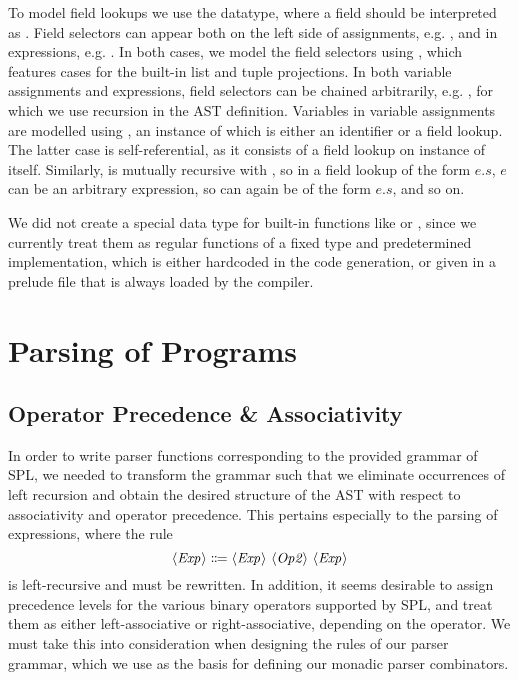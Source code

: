 To model field lookups we use the  datatype, where a field
 should be interpreted as .
Field selectors can appear both on the left side of assignments, e.g.
, and in expressions, e.g. . In both cases, we
model the field selectors using , which features cases for the
built-in list and tuple projections.
In both variable assignments and expressions, field selectors can be chained
arbitrarily, e.g. , for which we use recursion in the AST
definition.
Variables in variable assignments are modelled using , an
instance of which is either an identifier or a field lookup. The latter case is
self-referential, as it consists of a field lookup on instance of
 itself.
Similarly,  is mutually recursive with , so in
a field lookup of the form $e.s$, $e$ can be an arbitrary expression, so can
again be of the form $e.s$, and so on.

We did not create a special data type for built-in functions like
 or , since we currently treat them as regular functions
of a fixed type and predetermined implementation, which is either hardcoded in
the code generation, or given in a prelude file that is always loaded by the
compiler.




\section{Parsing of Programs} \label{sec:parsing-programs}

\subsection{Operator Precedence \& Associativity}

In order to write parser functions corresponding to the provided grammar of SPL,
we needed to transform the grammar such that we eliminate occurrences of left
recursion and obtain the desired structure of the AST with respect to
associativity and operator precedence.
This pertains especially to the parsing of expressions, where the rule
\[ \NT{Exp} \Coloneqq \NT{Exp}\ \NT{Op2}\ \NT{Exp} \]
is left-recursive and must be rewritten.
In addition, it seems desirable to assign precedence levels for the various
binary operators supported by SPL, and treat them as either left-associative or
right-associative, depending on the operator.
We must take this into consideration when designing the rules of our parser
grammar, which we use as the basis for defining our monadic parser combinators.


